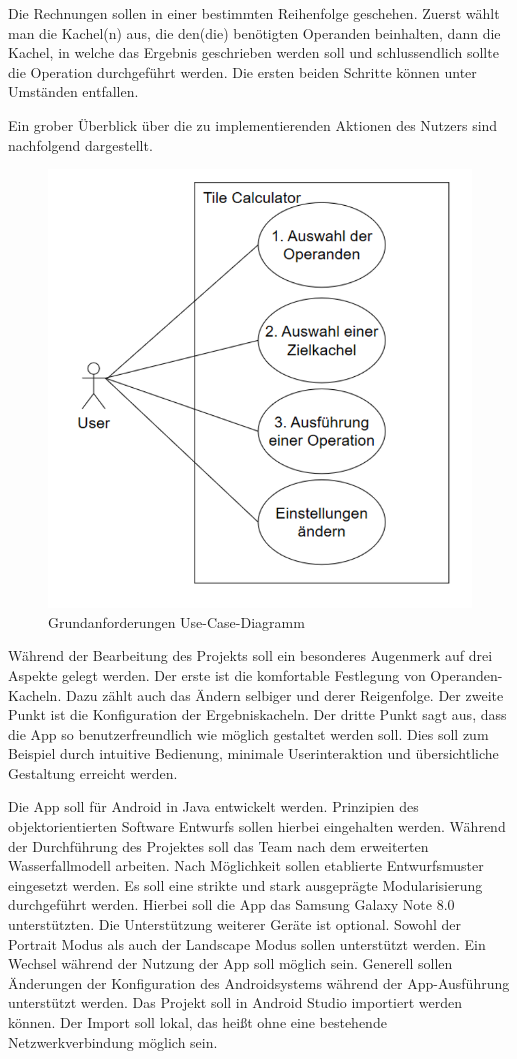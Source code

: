 Die Rechnungen sollen in einer bestimmten Reihenfolge geschehen. Zuerst wählt man die Kachel(n) aus, die den(die) benötigten Operanden beinhalten, dann die Kachel, in welche das Ergebnis geschrieben werden soll und schlussendlich sollte die Operation durchgeführt werden. Die ersten beiden Schritte können unter Umständen entfallen. 

Ein grober Überblick über die zu implementierenden Aktionen des Nutzers sind  nachfolgend dargestellt.

\begin{figure}[h]
	\includegraphics[width=0.75\columnwidth]{img/funktionsumfang-grundanforderungen-use-case-diagramm}
	\caption[Grundanforderungen Use-Case-Diagramm]{Grundanforderungen Use-Case-Diagramm\footnotemark}
\end{figure}

Während der Bearbeitung des Projekts soll ein besonderes Augenmerk auf drei Aspekte gelegt werden. Der erste ist die komfortable Festlegung von Operanden-Kacheln. Dazu zählt auch das Ändern selbiger und derer Reigenfolge. Der zweite Punkt ist die Konfiguration der Ergebniskacheln. Der dritte Punkt sagt aus, dass die App so benutzerfreundlich wie möglich gestaltet werden soll. Dies soll zum Beispiel durch intuitive Bedienung, minimale Userinteraktion und übersichtliche Gestaltung erreicht werden. 

Die App soll für Android in Java entwickelt werden. Prinzipien des objektorientierten Software Entwurfs sollen hierbei eingehalten werden. Während der Durchführung des Projektes soll das Team nach dem erweiterten Wasserfallmodell arbeiten. Nach Möglichkeit sollen etablierte Entwurfsmuster eingesetzt werden. Es soll eine strikte und stark ausgeprägte Modularisierung durchgeführt werden. Hierbei soll die App das Samsung Galaxy Note 8.0 unterstützten. Die Unterstützung weiterer Geräte ist optional. Sowohl der Portrait Modus als auch der Landscape Modus sollen unterstützt werden. Ein Wechsel während der Nutzung der App soll möglich sein. Generell sollen Änderungen der Konfiguration des Androidsystems während der App-Ausführung unterstützt werden. Das Projekt soll in Android Studio importiert werden können. Der Import soll lokal, das heißt ohne eine bestehende Netzwerkverbindung möglich sein.

